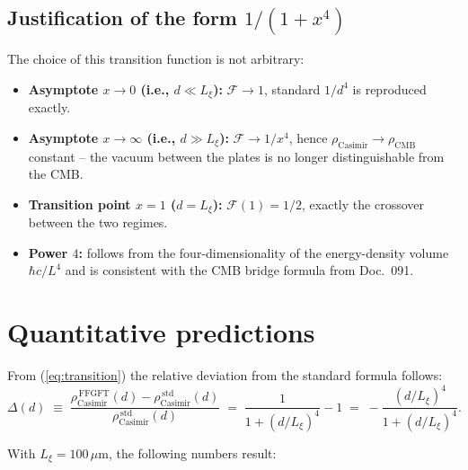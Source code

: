 \subsection{Justification of the form $1/(1+x^4)$}

The choice of this transition function is not arbitrary:
\begin{itemize}[leftmargin=2em,itemsep=2pt,topsep=2pt]
  \item \textbf{Asymptote $x \to 0$ (i.e., $d \ll L_\xi$):}
        $\mathcal{F} \to 1$, standard $1/d^4$ is reproduced exactly.
  \item \textbf{Asymptote $x \to \infty$ (i.e., $d \gg L_\xi$):}
        $\mathcal{F} \to 1/x^4$, hence $\rho_\text{Casimir} \to
        \rho_\text{CMB}$ constant -- the vacuum between the plates is
        no longer distinguishable from the CMB.
  \item \textbf{Transition point $x = 1$ ($d = L_\xi$):}
        $\mathcal{F}(1) = 1/2$, exactly the crossover between the
        two regimes.
  \item \textbf{Power $4$:} follows from the four-dimensionality of
        the energy-density volume $\hbar c/L^4$ and is consistent
        with the CMB bridge formula from Doc.~091.
\end{itemize}

\section{Quantitative predictions}
\label{sec:numbers}

From (\ref{eq:transition}) the relative deviation from the standard
formula follows:
\begin{equation}
  \Delta(d) \;\equiv\; \frac{\rho_\text{Casimir}^{\,\text{FFGFT}}(d)
                              - \rho_\text{Casimir}^{\,\text{std}}(d)}
                            {\rho_\text{Casimir}^{\,\text{std}}(d)}
  \;=\; \frac{1}{1 + (d/L_\xi)^4} - 1
  \;=\; -\frac{(d/L_\xi)^4}{1 + (d/L_\xi)^4}.
  \label{eq:delta}
\end{equation}

With $L_\xi = 100\,\mu$m, the following numbers result:

